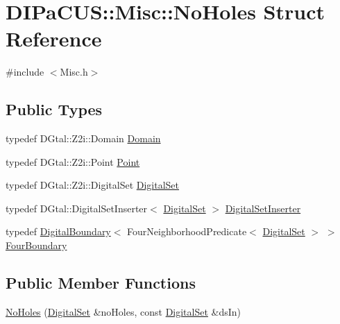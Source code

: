 \hypertarget{structDIPaCUS_1_1Misc_1_1NoHoles}{}\section{D\+I\+Pa\+C\+US\+:\+:Misc\+:\+:No\+Holes Struct Reference}
\label{structDIPaCUS_1_1Misc_1_1NoHoles}


{\ttfamily \#include $<$Misc.\+h$>$}

\subsection*{Public Types}
\begin{DoxyCompactItemize}
\item 
typedef D\+Gtal\+::\+Z2i\+::\+Domain \mbox{\hyperlink{structDIPaCUS_1_1Misc_1_1NoHoles_a4cce903bbbf4efeeb5c3706f434e1800}{Domain}}
\item 
typedef D\+Gtal\+::\+Z2i\+::\+Point \mbox{\hyperlink{structDIPaCUS_1_1Misc_1_1NoHoles_a596a57c7b9badcf299feb9649c05158b}{Point}}
\item 
typedef D\+Gtal\+::\+Z2i\+::\+Digital\+Set \mbox{\hyperlink{structDIPaCUS_1_1Misc_1_1NoHoles_aea4bec251425e3c31593c97ec33a9dda}{Digital\+Set}}
\item 
typedef D\+Gtal\+::\+Digital\+Set\+Inserter$<$ \mbox{\hyperlink{structDIPaCUS_1_1Misc_1_1NoHoles_aea4bec251425e3c31593c97ec33a9dda}{Digital\+Set}} $>$ \mbox{\hyperlink{structDIPaCUS_1_1Misc_1_1NoHoles_a0d0daa979d1fce71944e06ad181ae6aa}{Digital\+Set\+Inserter}}
\item 
typedef \mbox{\hyperlink{structDIPaCUS_1_1Misc_1_1DigitalBoundary}{Digital\+Boundary}}$<$ Four\+Neighborhood\+Predicate$<$ \mbox{\hyperlink{structDIPaCUS_1_1Misc_1_1NoHoles_aea4bec251425e3c31593c97ec33a9dda}{Digital\+Set}} $>$ $>$ \mbox{\hyperlink{structDIPaCUS_1_1Misc_1_1NoHoles_a2b822f2616887c376dd3e524d1086c92}{Four\+Boundary}}
\end{DoxyCompactItemize}
\subsection*{Public Member Functions}
\begin{DoxyCompactItemize}
\item 
\mbox{\hyperlink{structDIPaCUS_1_1Misc_1_1NoHoles_ac100d4aa947d8acc9ae59739184ea488}{No\+Holes}} (\mbox{\hyperlink{structDIPaCUS_1_1Misc_1_1NoHoles_aea4bec251425e3c31593c97ec33a9dda}{Digital\+Set}} \&no\+Holes, const \mbox{\hyperlink{structDIPaCUS_1_1Misc_1_1NoHoles_aea4bec251425e3c31593c97ec33a9dda}{Digital\+Set}} \&ds\+In)
\end{DoxyCompactItemize}


